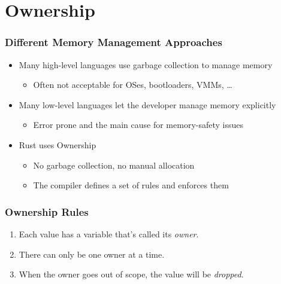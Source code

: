 \section{Ownership}

\begin{frame}
    \frametitle{Different Memory Management Approaches}

    \begin{itemize}
        \item Many high-level languages use garbage collection to manage memory
        \begin{itemize}
            \item Often not acceptable for OSes, bootloaders, VMMs, \dots
        \end{itemize}
        \pause
        \item Many low-level languages let the developer manage memory explicitly
        \begin{itemize}
            \item Error prone and the main cause for memory-safety issues
        \end{itemize}
        \pause
        \item Rust uses Ownership
        \begin{itemize}
            \item No garbage collection, no manual allocation
            \item The compiler defines a set of rules and enforces them
        \end{itemize}
    \end{itemize}
\end{frame}

\begin{frame}[fragile]
    \frametitle{Ownership Rules}

    \begin{enumerate}
        \item Each value has a variable that's called its \emph{owner}.
        \item There can only be one owner at a time.
        \item When the owner goes out of scope, the value will be \emph{dropped}.
    \end{enumerate}
\end{frame}

